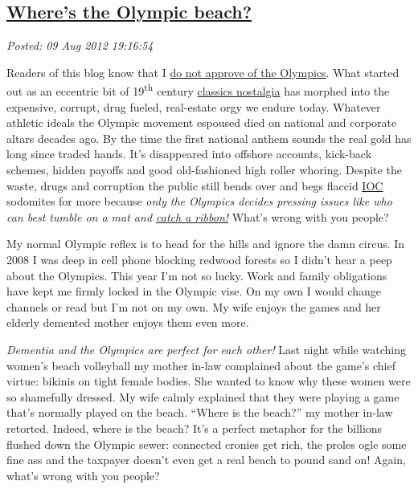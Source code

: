 %

\subsection*{\href{http://bakerjd99.wordpress.com/2012/08/09/wheres-the-olympic-beach/}{Where's the Olympic beach?}}


\noindent\emph{Posted: 09 Aug 2012 19:16:54}
\vspace{6pt}

Readers of this blog know that I
\href{http://bakerjd99.wordpress.com/2009/10/03/my-olympic-spirit/}{do
not approve of the Olympics}. What started out as an eccentric bit of
19\textsuperscript{th} century
\href{http://history1800s.about.com/od/sports/a/Coubertin.htm}{classics
nostalgia} has morphed into the expensive, corrupt, drug fueled,
real-estate orgy we endure today. Whatever athletic ideals the Olympic
movement espoused died on national and corporate altars decades ago. By
the time the first national anthem sounds the real gold has long since
traded hands. It's disappeared into offshore accounts, kick-back
schemes, hidden payoffs and good old-fashioned high roller whoring.
Despite the waste, drugs and corruption the public still bends over and
begs flaccid
\href{http://observer.com/2012/07/those-dirty-rings-corruption-prone-ioc-always-goes-for-the-gold/}{IOC}
sodomites for more because \emph{only the Olympics decides pressing
issues like who can best tumble on a mat and \href{http://www.huffingtonpost.com/elaine-dai/post_3740_b_1746836.html}{catch a ribbon!}} What's wrong
with you people?

My normal Olympic reflex is to head for the hills and ignore the damn
circus. In 2008 I was deep in cell phone blocking redwood forests so I
didn't hear a peep about the Olympics. This year I'm not so lucky. Work
and family obligations have kept me firmly locked in the Olympic vise.
On my own I would change channels or read but I'm not on my own. My wife
enjoys the games and her elderly demented mother enjoys them even more.

\emph{Dementia and the Olympics are perfect for each other!} Last night
while watching women's beach volleyball my mother in-law complained
about the game's chief virtue: bikinis on tight female bodies. She
wanted to know why these women were so shamefully dressed. My wife
calmly explained that they were playing a game that's normally played on
the beach. ``Where is the beach?'' my mother in-law retorted. Indeed,
where is the beach? It's a perfect metaphor for the billions flushed
down the Olympic sewer: connected cronies get rich, the proles ogle some
fine ass and the taxpayer doesn't even get a real beach to pound sand
on! Again, what's wrong with you people?

